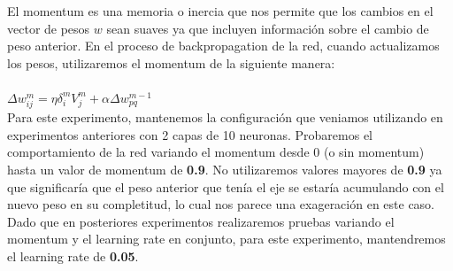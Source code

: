 El momentum es una memoria o inercia que nos permite que los cambios en el vector de pesos $w$ sean suaves ya que incluyen información sobre el cambio de peso anterior. 
En el proceso de backpropagation de la red, cuando actualizamos los pesos, utilizaremos el momentum de la siguiente manera:
\\
\\
$\Delta w_{ij}^{m} = \eta \delta_{i}^{m}V_{j}^{m} + \alpha \Delta w_{pq}^{m-1}$
\\

Para este experimento, mantenemos la configuración que veniamos utilizando en experimentos anteriores con 2 capas de 10 neuronas. Probaremos el comportamiento de la red 
variando el momentum desde $0$ (o sin momentum) hasta un valor de momentum de \textbf{0.9}. No utilizaremos valores mayores de \textbf{0.9} ya que significaría que el peso anterior que 
tenía el eje se estaría acumulando con el nuevo peso en su completitud, lo cual nos parece una exageración en este caso. Dado que en posteriores experimentos realizaremos
pruebas variando el momentum y el learning rate en conjunto, para este experimento, mantendremos el learning rate de \textbf{0.05}.

